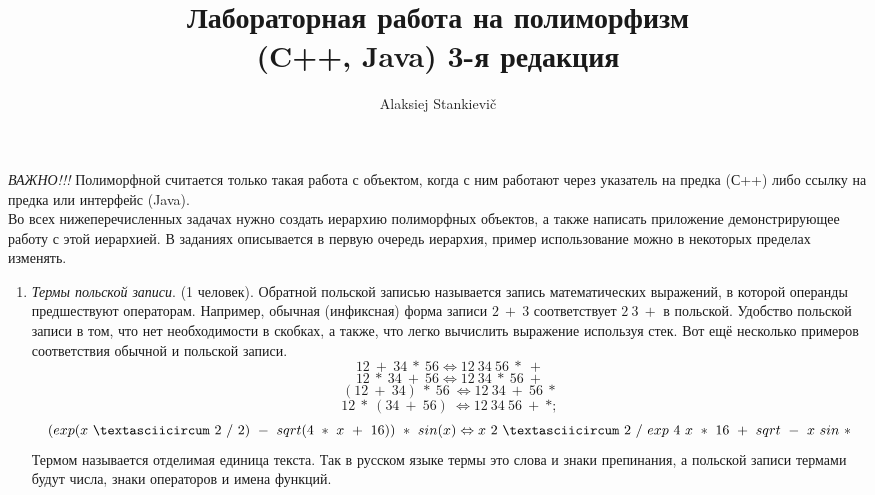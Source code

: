 \documentclass[12pt]{report}
\author{Alaksiej Stankievič}
\title{Лабораторная работа на полиморфизм\\(C++, Java) 3-я редакция}
\begin{document}
 \maketitle
 
 \emph{ВАЖНО!!!} Полиморфной считается только такая работа с объектом, когда с ним работают через указатель на 
предка (С++) либо ссылку на предка или интерфейс (Java).\\
 
 Во всех нижеперечисленных задачах нужно создать иерархию полиморфных объектов, а также написать приложение 
 демонстрирующее работу с этой иерархией. В заданиях описывается в первую очередь иерархия, пример использование
 можно в некоторых пределах изменять.
 \begin{enumerate}
  \item \emph{Термы польской записи}. (1 человек). Обратной польской записью  называется запись математических выражений, в которой операнды предшествуют операторам.
  Например, обычная (инфиксная) форма записи $2~+~3$ соответствует $2~3~+$ в польской. Удобство польской записи в том,
  что нет необходимости в скобках, а также, что легко вычислить выражение используя стек.
  Вот ещё несколько примеров соответствия обычной и польской записи.
  \begin{equation}
   12~+~34~*~56\Leftrightarrow{}12~34~56~*~+
  \end{equation}
  \begin{equation}
   12~*~34~+~56\Leftrightarrow{}12~34~*~56~+
  \end{equation}
  \begin{equation}
   (12~+~34)~*~56~\Leftrightarrow{}12~34~+~56~*
  \end{equation}
  \begin{equation}
   12~*~(34~+~56)~\Leftrightarrow{}12~34~56~+~*;
  \end{equation}
  \begin{equation}
   (exp(x~\textasciicircum~2~/~2)~-~sqrt(4~*~x~+~16))~*~sin(x) \\
   \Leftrightarrow x~2~\textasciicircum~2~/~exp~4~x~*~16~+~sqrt~-~x~sin~*
  \end{equation}  
  Термом называется отделимая единица текста. Так в русском языке термы это слова и знаки препинания, а польской записи
  термами будут числа, знаки операторов и имена функций. 
  

\end{enumerate}
\end{document}
